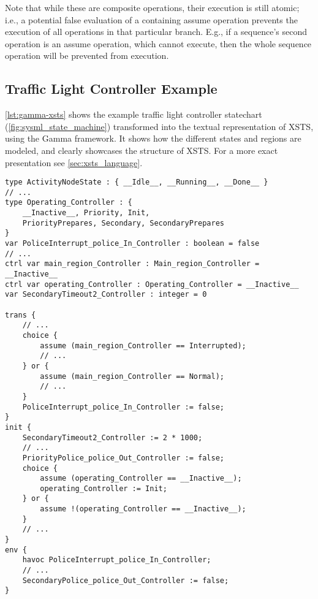 Note that while these are composite operations, their execution is still atomic; i.e., a potential false evaluation of a containing assume operation prevents the execution of all operations in that particular branch. E.g., if a sequence's second operation is an assume operation, which cannot execute, then the whole sequence operation will be prevented from execution.

\subsection{Traffic Light Controller Example}

\autoref{lst:gamma-xsts} shows the example traffic light controller statechart (\autoref{fig:sysml_state_machine}) transformed into the textual representation of XSTS, using the Gamma framework. It shows how the different states and regions are modeled, and clearly showcases the structure of XSTS. For a more exact presentation see \autoref{sec:xsts_language}.

\begin{lstlisting}[float,language=xsts, caption={Gamma XSTS Language representing the traffic light controller statechart.}, label={lst:gamma-xsts}]
type ActivityNodeState : { __Idle__, __Running__, __Done__ }
// ...
type Operating_Controller : { 
	__Inactive__, Priority, Init, 
	PriorityPrepares, Secondary, SecondaryPrepares
}
var PoliceInterrupt_police_In_Controller : boolean = false
// ...
ctrl var main_region_Controller : Main_region_Controller = __Inactive__
ctrl var operating_Controller : Operating_Controller = __Inactive__
var SecondaryTimeout2_Controller : integer = 0

trans {
	// ...
	choice {
		assume (main_region_Controller == Interrupted); 
		// ...
	} or {
		assume (main_region_Controller == Normal); 
		// ...
	}
	PoliceInterrupt_police_In_Controller := false;
}
init {
	SecondaryTimeout2_Controller := 2 * 1000;
	// ...
	PriorityPolice_police_Out_Controller := false;
	choice {
		assume (operating_Controller == __Inactive__);
		operating_Controller := Init;
	} or {
		assume !(operating_Controller == __Inactive__);
	}
	// ...
}
env {
	havoc PoliceInterrupt_police_In_Controller;
	// ...
	SecondaryPolice_police_Out_Controller := false;
}
\end{lstlisting}
